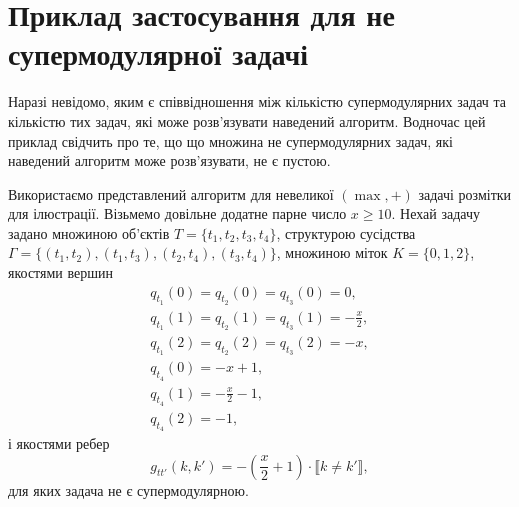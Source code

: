 \section{Приклад застосування для не супермодулярної задачі}
Наразі невідомо, яким є співвідношення між кількістю супермодулярних задач та кількістю тих задач, 
які може розв'язувати наведений алгоритм. Водночас цей приклад свідчить про те, що
що множина не супермодулярних задач, які наведений
алгоритм може розв’язувати, не є пустою.


Використаємо представлений алгоритм для невеликої $(\max,+)$ задачі розмітки для ілюстрації.
Візьмемо довільне додатне парне число $x\geq 10$. Нехай задачу задано множиною
об'єктів $T=\{t_1,t_2,t_3,t_4\}$, структурою сусідства \\$\Gamma=\{(t_1,t_2),(t_1,t_3),(t_2,t_4),(t_3,t_4)\}$, 
множиною міток $K=\{0,1,2\}$, якостями вершин 
\begin{equation}
    \begin{aligned}
       q_{t_1}(0)=q_{t_2}(0)=q_{t_3}(0)=0,\\
       q_{t_1}(1)=q_{t_2}(1)=q_{t_3}(1)=-\frac{x}{2},\\
       q_{t_1}(2)=q_{t_2}(2)=q_{t_3}(2)=-x,\\
       q_{t_4}(0)=-x+1,\\
       q_{t_4}(1)=-\frac{x}{2}-1,\\
       q_{t_4}(2)=-1,
    \end{aligned}
\end{equation}
і якостями ребер 
\begin{equation}
    g_{tt'}(k,k')=-\left(\frac{x}{2}+1\right)\cdot\llbracket k\neq k'\rrbracket,
\end{equation}
для яких задача не є супермодулярною.

